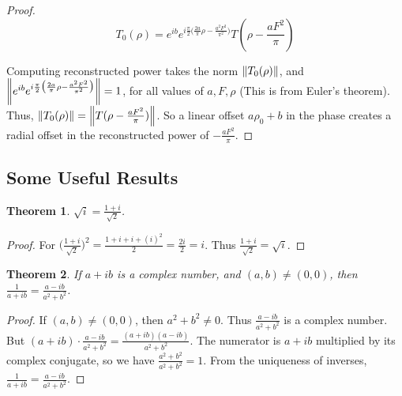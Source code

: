 \documentclass{article}
\theoremstyle{mystyle}
\newtheorem{theorem}{Theorem}[section]
\begin{document}
\begin{proof}
\begin{equation}
T_0(\rho) = e^{ib}e^{i\frac{\pi}{2}\big(\frac{2a}{\pi}\rho - \frac{a^2F^2}{\pi^2}\big)}T(\rho - \frac{aF^2}{\pi})
\end{equation}

Computing reconstructed power takes the norm $\norm{T_{0}(\rho)}$, and $\norm{e^{ib}e^{i\frac{\pi}{2}\big(\frac{2a}{\pi}\rho - \frac{a^2F^2}{\pi^2}\big)}} = 1$, for all values of $a,F, \rho$ (This is from Euler's theorem). Thus, $\norm{T_{0}(\rho)} = \norm{T(\rho - \frac{aF^2}{\pi})}$. So a linear offset $a\rho_0+b$ in the phase creates a radial offset in the reconstructed power of $-\frac{aF^2}{\pi}$.
\end{proof}

\subsection{Some Useful Results}

\begin{theorem}
$\sqrt{i} = \frac{1+i}{\sqrt{2}}$.
\end{theorem}
\begin{proof}
For $\big(\frac{1+i}{\sqrt{2}}\big)^2 = \frac{1 + i + i +(i)^2}{2} = \frac{2i}{2} = i$. Thus $\frac{1+i}{\sqrt{2}} = \sqrt{i}$.
\end{proof}

\begin{theorem}
If $a+ib$ is a complex number, and $(a,b) \ne (0,0)$, then $\frac{1}{a+ib} = \frac{a-ib}{a^2+b^2}$.
\end{theorem}
\begin{proof}
If $(a,b)\ne (0,0)$, then $a^2+b^2 \ne 0$. Thus $\frac{a-ib}{a^2+b^2}$ is a complex number. But $(a+ib)\cdot \frac{a-ib}{a^2+b^2} = \frac{(a+ib)(a-ib)}{a^2+b^2}$. The numerator is $a+ib$ multiplied by its complex conjugate, so we have $\frac{a^2+b^2}{a^2+b^2} = 1$. From the uniqueness of inverses, $\frac{1}{a+ib} = \frac{a-ib}{a^2+b^2}$.
\end{proof}
\end{document}

